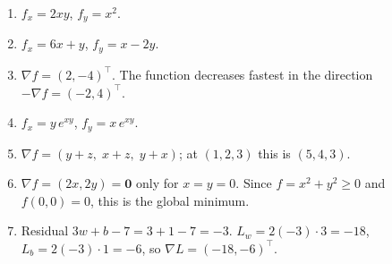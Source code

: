 \begin{enumerate}[label=\textbf{\ansnum.\arabic*}]
  \item $f_x=2xy$, $f_y=x^2$.
  \item $f_x=6x+y$, $f_y=x-2y$.
  \item $\nabla f=(2,-4)^\top$. The function decreases fastest in the direction $-\nabla f=(-2,4)^\top$.
  \item $f_x=y\,e^{xy}$, $f_y=x\,e^{xy}$.
  \item $\nabla f=(y+z,\;x+z,\;y+x)$; at $(1,2,3)$ this is $(5,4,3)$.
  \item $\nabla f=(2x,2y)=\mathbf 0$ only for $x=y=0$. Since $f=x^2+y^2\ge0$ and $f(0,0)=0$, this is the global minimum.
  \item[\textbf{\ansnum.7}] Residual $3w+b-7=3+1-7=-3$. $L_w=2(-3)\cdot3=-18$, $L_b=2(-3)\cdot1=-6$, so $\nabla L=(-18,-6)^\top$.
\end{enumerate}
